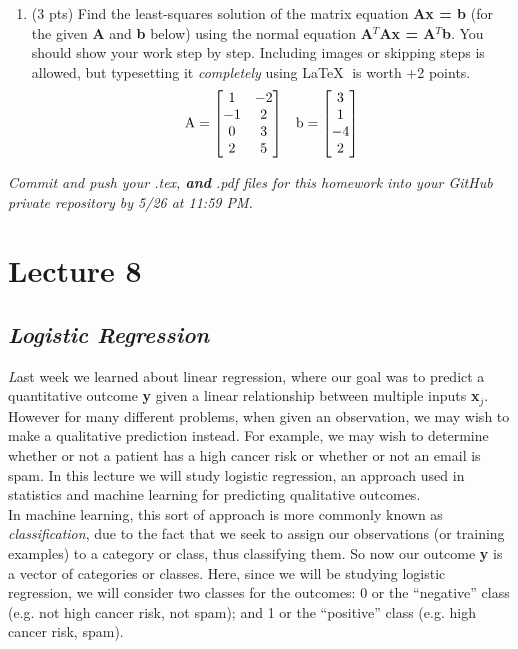 \documentclass[11pt,a4paper,oneside]{report}
\begin{document}
\begin{enumerate}
\item (3 pts) Find the least-squares solution of the matrix equation {\bf Ax = b} (for the given {\bf A} and {\bf b} below) using the normal equation {\bf A}$^T${\bf Ax = A}$^T${\bf b}. You should show your work step by step. Including images or skipping steps is allowed, but typesetting it \emph{completely} using \LaTeX $\;$ is worth +2 points.
\[
\textnormal{A} = \begin{bmatrix}
1 & -2\\
-1 & 2\\
0 & 3 \\
2 & 5
\end{bmatrix}
\;\;\;
\textnormal{b} = \begin{bmatrix}
3 \\ 1 \\ -4 \\ 2
\end{bmatrix} 
\]
\end{enumerate}

{\it Commit and push your .tex, {\bf and} .pdf files for this homework into your GitHub private repository by 5/26 at 11:59 PM.}


\newpage


\section*{Lecture 8}

{\center\color{magenta}
\subsection*{\it\huge Logistic Regression}}

{\it\huge L}ast week we learned about linear regression, where our goal was to predict a quantitative outcome {\bf y} given a linear relationship between multiple inputs {\bf x}$_j$. However for many different problems, when given an observation, we may wish to make a qualitative prediction instead. For example, we may wish to determine whether or not a patient has a high cancer risk or whether or not an email is spam. In this lecture we will study logistic regression, an approach used in statistics and machine learning for predicting qualitative outcomes. \\

In machine learning, this sort of approach is more commonly known as \emph{classification}, due to the fact that we seek to assign our observations (or training examples) to a category or class, thus classifying them. So now our outcome {\bf y} is a vector of categories or classes. Here, since we will be studying logistic regression, we will consider two classes for the outcomes: 0 or the ``negative'' class (e.g. not high cancer risk, not spam); and 1 or the ``positive'' class (e.g. high cancer risk, spam). \\
\end{document}
